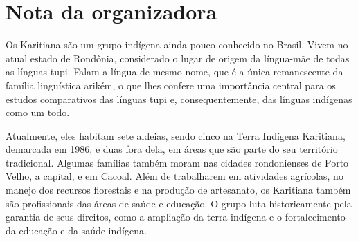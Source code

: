 \chapter{Nota da organizadora}

\noindent{}Os Karitiana são um grupo indígena ainda pouco conhecido no Brasil. Vivem no atual estado de Rondônia, considerado o lugar de origem da língua-mãe de todas as línguas tupi. Falam a língua de mesmo nome, que é a única remanescente da família linguística arikém, o que lhes confere uma importância central para os estudos comparativos das línguas tupi e, consequentemente, das línguas indígenas como um todo.


Atualmente, eles habitam sete aldeias, sendo cinco na Terra Indígena Karitiana, demarcada em 1986, e duas fora dela, em áreas que são parte do seu território tradicional. Algumas famílias também moram nas cidades rondonienses de Porto Velho, a capital, e em Cacoal. Além de trabalharem em atividades agrícolas, no manejo dos recursos florestais e na produção de artesanato, os Karitiana também são profissionais das áreas de saúde e educação. O grupo luta historicamente pela garantia de seus direitos, como a ampliação da terra indígena e o fortalecimento da educação e da saúde indígena.
